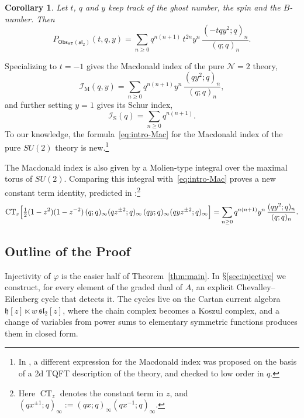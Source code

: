 \documentclass[11pt]{amsart}
\numberwithin{equation}{section}
\renewcommand{\S}{\mbox{$\mathsection$}}
\newtheorem{corollary}[theorem]{Corollary}
\theoremstyle{definition}
\theoremstyle{remark}
\newcommand{\sltwo}{\mathfrak{sl}_2}
\newcommand{\hh}{\mathfrak{h}}
\newcommand{\Obs}{\mathsf{Obs}_{\mathsf{HT}}}
\begin{document}
\begin{corollary}\label{cor:intro}
Let $t$, $q$ and $y$ keep track of the ghost number, the spin and the $B$-number. Then
\begin{equation}\label{eq:intro-poincare}
P_{\Obs(\sltwo)}(t,q,y)=\sum_{n\ge0}q^{n(n+1)}\,t^{2n}y^{n}\,\frac{(-tqy^2;q)_n}{(q;q)_n}.
\end{equation}
\end{corollary}
Specializing to $t=-1$ gives the Macdonald index of the pure $\mathcal{N}=2$ theory,
\begin{equation}\label{eq:intro-Mac}
\mathcal I_{\mathrm M}(q,y)=\sum_{n\ge0}q^{n(n+1)}y^n\,\frac{(qy^2;q)_n}{(q;q)_n},
\end{equation}
and further setting $y=1$ gives its Schur index,
\begin{equation}\label{eq:intro-Schur}
\mathcal I_{\mathrm S}(q)=\sum_{n\ge0}q^{n(n+1)}.
\end{equation}
To our knowledge, the formula~\eqref{eq:intro-Mac} for the Macdonald index of the pure $SU(2)$ theory is new.\footnote{In \cite{Son16}, a different expression for the Macdonald index was proposed on the basis of a 2d TQFT description of the theory, and checked to low order in $q$.}

The Macdonald index is also given by a Molien-type integral over the maximal torus of $SU(2)$. Comparing this integral with~\eqref{eq:intro-Mac} proves a new constant term identity, predicted in \cite[(3.127)]{Kha26}:\footnote{Here $\operatorname{CT}_z$ denotes the constant term in $z$, and $(qx^{\pm1};q)_\infty:=(qx;q)_\infty(qx^{-1};q)_\infty$.}
\begin{equation}\label{eq:intro-CT}
\operatorname{CT}_z\Bigl[\tfrac12(1-z^2)(1-z^{-2})\,(q;q)_\infty(qz^{\pm2};q)_\infty\,(qy;q)_\infty(qyz^{\pm2};q)_\infty\Bigr]
=\sum_{n\ge0}q^{n(n+1)}y^n\,\frac{(qy^2;q)_n}{(q;q)_n}.
\end{equation}

\subsection{Outline of the Proof}\label{subsec:idea}

Injectivity of $\varphi$ is the easier half of Theorem~\ref{thm:main}. In \S\ref{sec:injective} we construct, for every element of the graded dual of $A$, an explicit Chevalley--Eilenberg cycle that detects it. The cycles live on the Cartan current algebra $\hh[z]\ltimes w\,\sltwo[z]$, where the chain complex becomes a Koszul complex, and a change of variables from power sums to elementary symmetric functions produces them in closed form.
\end{document}
